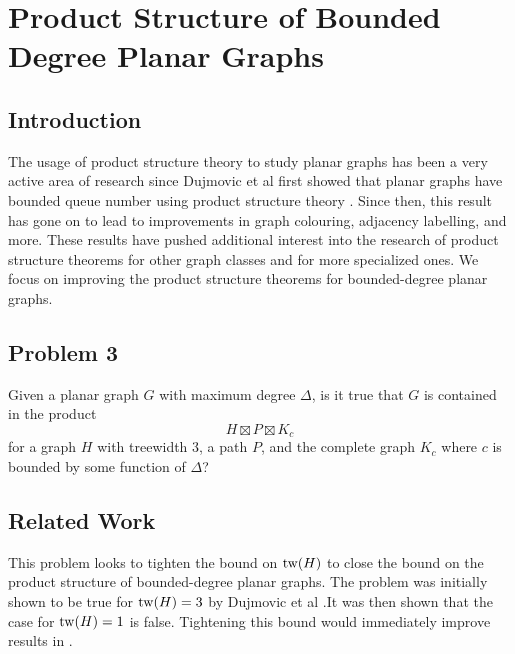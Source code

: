 \documentclass[../main.tex]{subfiles}
\begin{document}
	
	\section{Product Structure of Bounded Degree Planar Graphs}
	\subsection{Introduction}
	The usage of product structure theory to study planar graphs has been a very active area of research since Dujmovic et al first showed that planar graphs have bounded queue number using product structure theory \cite{DJMMUW20}. Since then, this result has gone on to lead to improvements in graph colouring\cite{DEJWW20}, adjacency labelling\cite{DEJGMM21,EJM23}, and more. 
	These results have pushed additional interest into the research of product structure theorems for other graph classes and for more specialized ones. We focus on improving the product structure theorems for bounded-degree planar graphs.
	
	\subsection{Problem 3}
	Given a planar graph $G$ with maximum degree $\Delta$, is it true that $G$ is contained in the product $$H\boxtimes P\boxtimes K_c$$ for a graph $H$ with treewidth 3, a path $P$, and the complete graph $K_c$ where $c$ is bounded by some function of $\Delta$?
	
	\subsection{Related Work}
	This problem looks to tighten the bound on $\operatorname{tw}(H)$ to close the bound on the product structure of bounded-degree planar graphs. The problem was initially shown to be true for $\operatorname{tw}(H)=3$ by Dujmovic et al \cite{DJMMUW20}.It was then shown that the case for $\operatorname{tw}(H)=1$ is false\cite{DJMMW24}. Tightening this bound would immediately improve results in \cite{?}.
	
	
	
	
\end{document}
